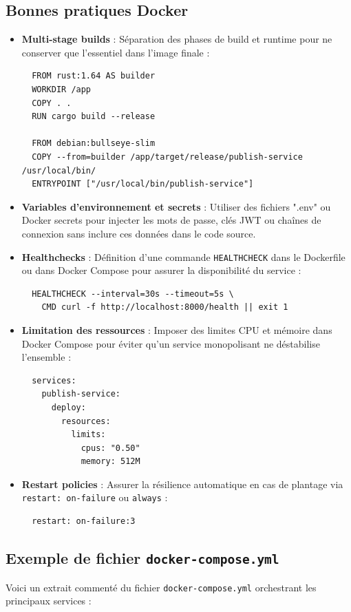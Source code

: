 \documentclass[12pt]{rapportPfe}
\begin{document}
\subsection{Bonnes pratiques Docker}
\begin{itemize}[itemsep=0.8em]
  \item \textbf{Multi-stage builds} : Séparation des phases de build et runtime pour ne conserver que l’essentiel dans l’image finale :
  \begin{verbatim}
  FROM rust:1.64 AS builder
  WORKDIR /app
  COPY . .
  RUN cargo build --release

  FROM debian:bullseye-slim
  COPY --from=builder /app/target/release/publish-service /usr/local/bin/
  ENTRYPOINT ["/usr/local/bin/publish-service"]
  \end{verbatim}
  \item \textbf{Variables d’environnement et secrets} : Utiliser des fichiers ".env" ou Docker secrets pour injecter les mots de passe, clés JWT ou chaînes de connexion sans inclure ces données dans le code source.
  \item \textbf{Healthchecks} : Définition d’une commande \texttt{HEALTHCHECK} dans le Dockerfile ou dans Docker Compose pour assurer la disponibilité du service :
  \begin{verbatim}
  HEALTHCHECK --interval=30s --timeout=5s \
    CMD curl -f http://localhost:8000/health || exit 1
  \end{verbatim}
  \item \textbf{Limitation des ressources} : Imposer des limites CPU et mémoire dans Docker Compose pour éviter qu’un service monopolisant ne déstabilise l’ensemble :
  \begin{verbatim}
  services:
    publish-service:
      deploy:
        resources:
          limits:
            cpus: "0.50"
            memory: 512M
  \end{verbatim}
  \item \textbf{Restart policies} : Assurer la résilience automatique en cas de plantage via \texttt{restart: on-failure} ou \texttt{always} :
  \begin{verbatim}
  restart: on-failure:3
  \end{verbatim}
\end{itemize}

\subsection{Exemple de fichier \texttt{docker-compose.yml}}
Voici un extrait commenté du fichier \texttt{docker-compose.yml} orchestrant les principaux services :
\end{document}
